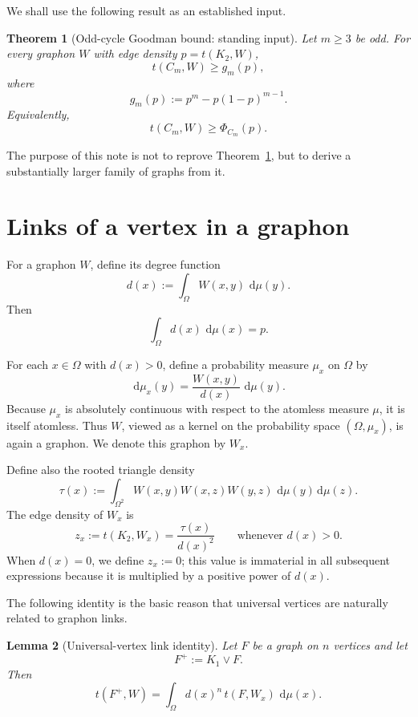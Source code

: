 \documentclass[11pt]{article}
\newtheorem{theorem}{Theorem}[section]
\newtheorem{lemma}[theorem]{Lemma}
\newcommand{\1}{\mathbf{1}}
\newcommand{\dd}{\,\mathrm{d}}
\newcommand{\join}{\vee}
\begin{document}
We shall use the following result as an established input.

\begin{theorem}[Odd-cycle Goodman bound: standing input]
\label{thm:odd-cycle-input}
Let $m\ge 3$ be odd.  For every graphon $W$ with edge density
$p=t(K_2,W)$,
\[
t(C_m,W)
\ge
g_m(p),
\]
where
\[
g_m(p)
:=
p^m-p(1-p)^{m-1}.
\]
Equivalently,
\[
t(C_m,W)\ge \Phi_{C_m}(p).
\]
\end{theorem}

The purpose of this note is not to reprove
Theorem~\ref{thm:odd-cycle-input}, but to derive a substantially larger
family of graphs from it.


\section{Links of a vertex in a graphon}

For a graphon $W$, define its degree function
\[
d(x):=\int_\Omega W(x,y)\,\dd\mu(y).
\]
Then
\[
\int_\Omega d(x)\,\dd\mu(x)=p.
\]

For each $x\in\Omega$ with $d(x)>0$, define a probability measure
$\mu_x$ on $\Omega$ by
\[
\dd\mu_x(y)
=
\frac{W(x,y)}{d(x)}\,\dd\mu(y).
\]
Because $\mu_x$ is absolutely continuous with respect to the atomless
measure $\mu$, it is itself atomless.  Thus $W$, viewed as a kernel on
the probability space $(\Omega,\mu_x)$, is again a graphon.
We denote this graphon by $W_x$.

Define also the rooted triangle density
\[
\tau(x)
:=
\int_{\Omega^2}
W(x,y)W(x,z)W(y,z)
\,\dd\mu(y)\dd\mu(z).
\]
The edge density of $W_x$ is
\[
z_x
:=
t(K_2,W_x)
=
\frac{\tau(x)}{d(x)^2}
\qquad
\text{whenever }d(x)>0.
\]
When $d(x)=0$, we define $z_x:=0$; this value is immaterial in all
subsequent expressions because it is multiplied by a positive power
of $d(x)$.

The following identity is the basic reason that universal vertices
are naturally related to graphon links.

\begin{lemma}[Universal-vertex link identity]
\label{lem:link-identity}
Let $F$ be a graph on $n$ vertices and let
\[
F^+:=K_1\join F.
\]
Then
\[
t(F^+,W)
=
\int_\Omega
d(x)^n\,t(F,W_x)\,\dd\mu(x).
\]
\end{lemma}
\end{document}
